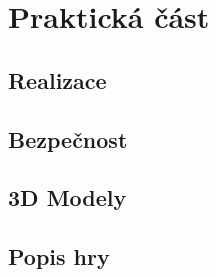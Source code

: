 \chapter{Praktická část}


\section{Realizace}





\section{Bezpečnost}


\section{3D Modely}


\section{Popis hry}

